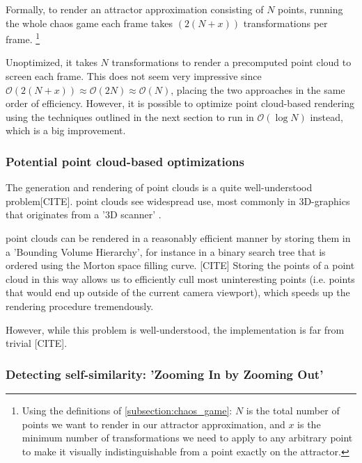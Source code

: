 \documentclass[11pt]{article}
\begin{document}
Formally, to render an attractor approximation consisting of \(N\) points, 
running the whole chaos game each frame takes \((2(N+x))\) transformations per frame. \footnote{Using the definitions of \autoref{subsection:chaos_game}: \(N\) is the total number of points we want to render in our attractor approximation, 
and \(x\) is the minimum number of transformations we need to apply to any arbitrary point to make it visually indistinguishable from a point exactly on the attractor.}

Unoptimized, it takes \(N\) transformations to render a precomputed point cloud to screen each frame.
This does not seem very impressive since \(\mathcal{O}(2(N+x)) \approx \mathcal{O}(2N) \approx \mathcal{O}(N)\),
placing the two approaches in the same order of efficiency. However, it is possible to optimize point cloud-based rendering using the techniques outlined in the next section
to run in \(\mathcal{O}(\log{N})\) instead, which is a big improvement.


\subsubsection{Potential point cloud-based optimizations}
\label{sec:org0e745e2}
\label{subsection:point_cloud_optimizations}

The generation and rendering of point clouds is a quite well-understood problem[CITE]. point clouds see widespread use,
most commonly in 3D-graphics that originates from a '3D scanner' .

point clouds can be rendered in a reasonably efficient manner by storing them in a 'Bounding Volume Hierarchy',
for instance in a binary search tree that is ordered using the Morton space filling curve. [CITE]
Storing the points of a point cloud in this way allows us to efficiently cull most uninteresting points (i.e. points that would end up outside of the current camera viewport),
which speeds up the rendering procedure tremendously.

However, while this problem is well-understood, the implementation is far from trivial [CITE].

\subsubsection{Detecting self-similarity: 'Zooming In by Zooming Out'}
\label{sec:org5b5a6f5}
\label{subsection:self_similarity}
\end{document}
